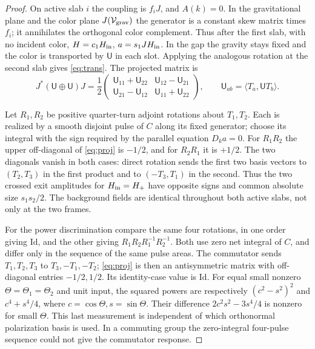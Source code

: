 \documentclass[11pt]{article}
\newcommand{\Id}{\mathrm{Id}}
\begin{document}
\begin{proof}
 On active slab \(i\) the coupling is \(f_i J\), and \(A(k)=0\). In the gravitational plane and the color plane \(J(\mathcal V_{\rm grav})\) the generator is a constant skew matrix times \(f_i\); it annihilates the orthogonal color complement. Thus after the first slab, with no incident color, \(H=c_1H_{\rm in}\), \(a=s_1 JH_{\rm in}\). In the gap the gravity stays fixed and the color is transported by \(\mathsf U\) in each slot. Applying the analogous rotation at the second slab gives \eqref{eq:trans}. The projected matrix is
 \begin{equation}\label{eq:proj}
 J^*(\mathsf U\oplus\mathsf U)J=
 \frac12\begin{pmatrix}
  \mathsf U_{11}+\mathsf U_{22} & \mathsf U_{12}-\mathsf U_{21}\\
  \mathsf U_{21}-\mathsf U_{12} & \mathsf U_{11}+\mathsf U_{22}
 \end{pmatrix},
 \qquad \mathsf U_{ab}=\langle T_a,\mathsf U T_b\rangle .
 \end{equation}

 Let \(R_1,R_2\) be positive quarter-turn adjoint rotations about \(T_1,T_2\). Each is realized by a smooth disjoint pulse of \(C\) along its fixed generator; choose its integral with the sign required by the parallel equation \(D_k a=0\). For \(R_1R_2\) the upper off-diagonal of \eqref{eq:proj} is \(-1/2\), and for \(R_2R_1\) it is \(+1/2\). The two diagonals vanish in both cases: direct rotation sends the first two basis vectors to \((T_2,T_3)\) in the first product and to \((-T_3,T_1)\) in the second. Thus the two crossed exit amplitudes for \(H_{\rm in}=H_+\) have opposite signs and common absolute size \(s_1s_2/2\). The background fields are identical throughout both active slabs, not only at the two frames.

 For the power discrimination compare the same four rotations, in one order giving \(\Id\), and the other giving \(R_1R_2R_1^{-1}R_2^{-1}\). Both use zero net integral of \(C\), and differ only in the sequence of the same pulse areas. The commutator sends \(T_1,T_2,T_3\) to \(T_3,-T_1,-T_2\); \eqref{eq:proj} is then an antisymmetric matrix with off-diagonal entries \(-1/2,1/2\). Its identity-case value is \(\Id\). For equal small nonzero \(\Theta=\Theta_1=\Theta_2\) and unit input, the squared powers are respectively \((c^2-s^2)^2\) and \(c^4+s^4/4\), where \(c=\cos\Theta,s=\sin\Theta\). Their difference \(2c^2s^2-3s^4/4\) is nonzero for small \(\Theta\). This last measurement is independent of which orthonormal polarization basis is used. In a commuting group the zero-integral four-pulse sequence could not give the commutator response.
\end{proof}
\end{document}
